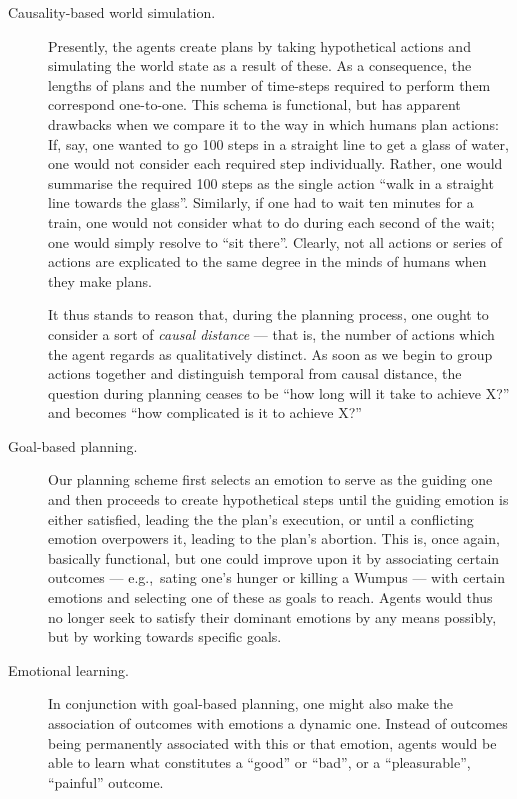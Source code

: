 \begin{description}
	\item[Causality-based world simulation.] Presently, the agents create plans by taking hypothetical actions and simulating the world state as a result of these. As a consequence, the lengths of plans and the number of time-steps required to perform them correspond one-to-one.
	This schema is functional, but has apparent drawbacks when we compare it to the way in which humans plan actions: If, say, one wanted to go 100 steps in a straight line to get a glass of water, one would not consider each required step individually. Rather, one would summarise the required 100 steps as the single action ``walk in a straight line towards the glass''. Similarly, if one had to wait ten minutes for a train, one would not consider what to do during each second of the wait; one would simply resolve to ``sit there''. Clearly, not all actions or series of actions are explicated to the same degree in the minds of humans when they make plans.
	
	 It thus stands to reason that, during the planning process, one ought to consider a sort of {\em causal distance} --- that is, the number of actions which the agent regards as qualitatively distinct. As soon as we begin to group actions together and distinguish temporal from causal distance, the question during planning ceases to be ``how long will it take to achieve X?'' and becomes ``how complicated is it to achieve X?''
	 
	 \item[Goal-based planning.] Our planning scheme first selects an emotion to serve as the guiding one and then  proceeds to create hypothetical steps until the guiding emotion is either satisfied, leading the the plan's execution, or until a conflicting emotion overpowers it, leading to the plan's abortion. This is, once again, basically functional, but one could improve upon it by associating certain outcomes --- e.g.,\ sating one's hunger or killing a Wumpus --- with certain emotions and selecting one of these as goals to reach. Agents would thus no longer seek to satisfy their dominant emotions by any means possibly, but by working towards specific goals. 
	 
	 \item[Emotional learning.] In conjunction with goal-based planning, one might also make the association of outcomes with emotions a dynamic one. Instead of outcomes being permanently associated with this or that emotion, agents would be able to learn what constitutes a ``good'' or ``bad'', or a ``pleasurable'', ``painful'' outcome. 
	 

\end{description}
